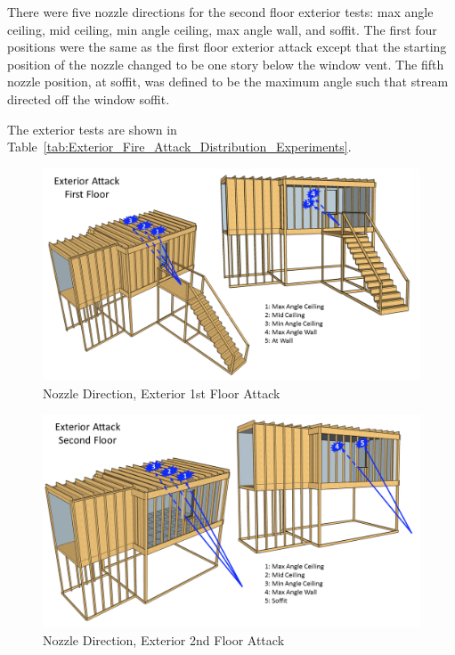 \documentclass{article}
\begin{document}
There were five nozzle directions for the second floor exterior tests: max angle ceiling, mid ceiling, min angle ceiling, max angle wall, and soffit. The first four positions were the same as the first floor exterior attack except that the starting position of the nozzle changed to be one story below the window vent. The fifth nozzle position, at soffit, was defined to be the maximum angle such that stream directed off the window soffit.

The exterior tests are shown in Table~\ref{tab:Exterior_Fire_Attack_Distribution_Experiments}.

\begin{figure}[!ht]
	\centering
	\includegraphics[width=\columnwidth]{Figures/Water_Distribution/Nozzle_Position_ExtFirstfloor}
	\caption{Nozzle Direction, Exterior 1st Floor Attack}
	\label{fig:Nozzle_Direction_Exterior_1st_Floor_Attack}
\end{figure}

\begin{figure}[!ht]
	\centering
	\includegraphics[width=\columnwidth]{Figures/Water_Distribution/Nozzle_Position_ExtSecondfloor}
	\caption{Nozzle Direction, Exterior 2nd Floor Attack}
	\label{fig:Nozzle_Direction_Exterior_2nd_Floor_Attack}
\end{figure}
\end{document}
